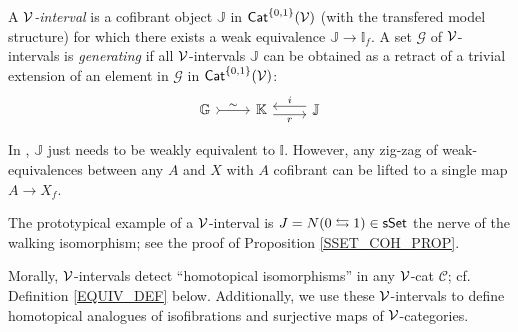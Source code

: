 \documentclass[a4paper,10pt
,draft
]{article}%
\newcommand{\I}{\mathbb I}
\newcommand{\J}{\mathbb J}
\renewcommand{\1}{\eta}%
\begin{document}
\begin{definition}
      A {\em $\mathcal V$-interval} is a cofibrant object $\J$ in $\mathsf{Cat}^{\left\{0,1\right\}}(\mathcal V)$ (with the transfered model structure)
      for which there exists a weak equivalence $\J \to \I_f$.
      A set $\mathcal{G}$ of $\mathcal V$-intervals is {\em generating} if all $\mathcal V$-intervals $\J$ can be obtained
      as a retract of a trivial extension of an element in $\mathcal{G}$ in $\mathsf{Cat}^{\left\{0,1\right\}}(\mathcal V)$:
      \begin{equation}
            \begin{tikzcd}
                  \mathbb{G} \arrow[r,rightarrowtail, "\sim"]
                  &
                  \mathbb{K} \arrow[r,yshift=-.3em, "r"']
                  &
                  \mathbb{J} \arrow[l,yshift=.3em, "i"']
            \end{tikzcd}
      \end{equation}
\end{definition}

\begin{remark}
      In \cite{BM13}, $\J$ just needs to be weakly equivalent to $\I$.
      However, any zig-zag of weak-equivalences between any $A$ and $X$ with $A$ cofibrant
      can be lifted to a single map $A \to X_f$.
\end{remark}

\begin{remark}
      The prototypical example of a $\mathcal V$-interval is $J = N(0 \leftrightarrows 1) \in \mathsf{sSet}$ the nerve of the walking isomorphism; see the proof of Proposition \ref{SSET_COH_PROP}.
\end{remark}

Morally, $\mathcal V$-intervals detect ``homotopical isomorphisms'' in any $\mathcal V$-cat $\mathcal C$; cf. Definition \ref{EQUIV_DEF} below.
Additionally, we use these $\mathcal V$-intervals to define homotopical analogues of isofibrations and surjective maps of $\mathcal V$-categories.
\end{document}
